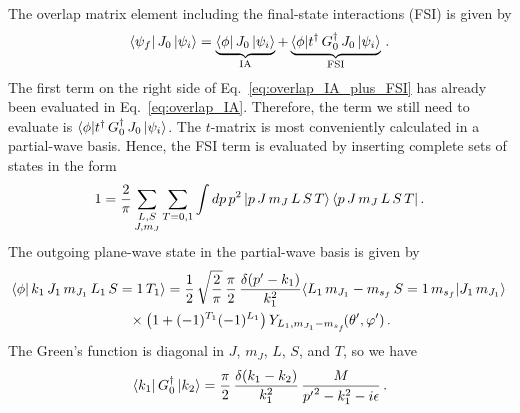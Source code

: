 	The overlap matrix element including the final-state interactions (FSI) is
	given by
	\begin{equation}
	 \langle \psi_f| \, J_0 \,|\psi_i \rangle
	 = \underbrace{\langle \phi| \, J_0 \,|\psi_i \rangle}_{\rm IA}
	 + \underbrace{\langle \phi| t^\dag \, G_0^\dag\, J_0 \,|\psi_i \rangle}_
	 {\rm FSI} \,.
	\label{eq:overlap_IA_plus_FSI}
	\end{equation}
	The first term on the right side of Eq.~\eqref{eq:overlap_IA_plus_FSI}
	has already been evaluated in Eq.~\eqref{eq:overlap_IA}.  Therefore, the term
	we still need to evaluate is $\langle \phi| t^\dag \, G_0^\dag\, J_0
	\,|\psi_i \rangle$.  The $t$-matrix is most conveniently calculated in a
	partial-wave basis.  Hence, the FSI term is evaluated by inserting complete
	sets of states in the form
	\begin{equation}
	 1 = \frac{2}{\pi} \sum_{\substack{L, S \\ J,  m_J }}
	 \sum_{T = 0, 1} \int dp \,p^2 \, |p \, J \, m_J \, L \, S \, T \rangle
	 \, \langle p \, J\, m_J \, L \, S \, T | \,.
	\label{eq:completeness_partial_wave}
	\end{equation}
	The outgoing plane-wave state in the partial-wave basis is given by
	\begin{multline}
	 \la \phi | \, k_1 \, J_1 \, m_{J_1} \, L_1 \, S = 1 \, T_1 \ra
	  =  \frac{1}{2} \, {\sqrt\frac{2}{\pi}} \, \frac{\pi}{2} \,
	 \frac{\delta(\pp - k_1)}{k_1 ^2}
	 \CG{L_1}{m_{J_1} - \msf}{S=1}{\msf}{J_1}{m_{J_1}}
	 \, \\
	 \null \times \big(1 + (-1)^{T_1} (-1)^{L_1}\big)
	 \,Y_{L_1,m_{J_1} - \msf}\!(\thetacm, \phicm) \,.
	\label{eq:phi_def_pw}
	\end{multline}
	The Green's
	function is diagonal in $J$, $m_J$, $L$, $S$, and $T$, so we have
	\begin{equation}
	 \langle k_1 | \, G_0^\dag \,| k_2 \rangle
	 = \frac{\pi}{2} \, \frac{\delta(k_1 - k_2)}{k_1^2}
	 \, \frac{M}{{p^\prime}^2 - k_1 ^2 - i\epsilon} \,.
	\label{eq:G0_def_pw}
	\end{equation}

